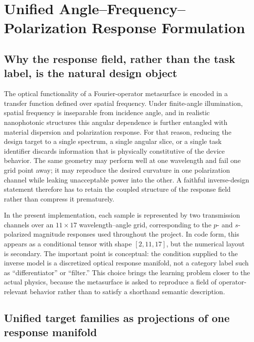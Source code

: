 \section{Unified Angle--Frequency--Polarization Response Formulation}

\subsection{Why the response field, rather than the task label, is the natural design object}

The optical functionality of a Fourier-operator metasurface is encoded in a transfer function defined over spatial frequency. Under finite-angle illumination, spatial frequency is inseparable from incidence angle, and in realistic nanophotonic structures this angular dependence is further entangled with material dispersion and polarization response. For that reason, reducing the design target to a single spectrum, a single angular slice, or a single task identifier discards information that is physically constitutive of the device behavior. The same geometry may perform well at one wavelength and fail one grid point away; it may reproduce the desired curvature in one polarization channel while leaking unacceptable power into the other. A faithful inverse-design statement therefore has to retain the coupled structure of the response field rather than compress it prematurely.

In the present implementation, each sample is represented by two transmission channels over an $11\times17$ wavelength--angle grid, corresponding to the $p$- and $s$-polarized magnitude responses used throughout the project. In code form, this appears as a conditional tensor with shape $[2,11,17]$, but the numerical layout is secondary. The important point is conceptual: the condition supplied to the inverse model is a discretized optical response manifold, not a category label such as ``differentiator'' or ``filter.'' This choice brings the learning problem closer to the actual physics, because the metasurface is asked to reproduce a field of operator-relevant behavior rather than to satisfy a shorthand semantic description.

\subsection{Unified target families as projections of one response manifold}

